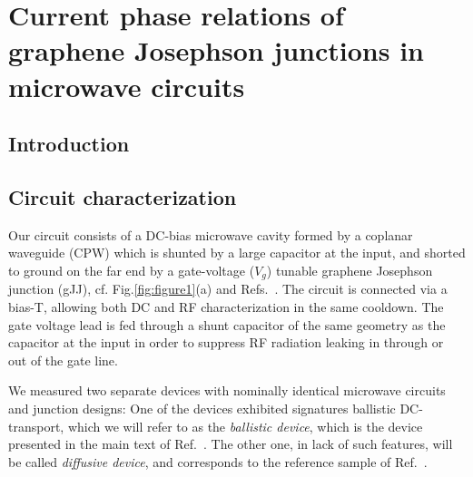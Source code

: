 \newchapstyle
\chapter{Current phase relations of graphene Josephson junctions in microwave circuits}
\label{chap:gJJ-CPR}


\begin{abstract}
	We perform extensive analysis of graphene Josephson junctions embedded in microwave circuits.
	By comparing a diffusive junction at \SI{15}{\milli\kelvin} with a ballistic one at \SI{15}{\milli\kelvin} and \SI{1}{\kelvin}, we are able to reconstruct the current-phase relation.
\end{abstract}

\newpage

\section{Introduction}

\section{Circuit characterization}

Our circuit consists of a DC-bias microwave cavity formed by a coplanar waveguide (CPW) which is shunted by a large capacitor at the input, and shorted to ground on the far end by a gate-voltage ($V_g$) tunable graphene Josephson junction (gJJ), cf. Fig.\ref{fig:figure1}(a) and Refs.~\cite{schmidtBallisticGrapheneSuperconducting2018,schmidtCurrentDetectionUsing2020,bosmanBroadbandArchitectureGalvanically2015c}.
%
The circuit is connected via a bias-T, allowing both DC and RF characterization in the same cooldown.
%
The gate voltage lead is fed through a shunt capacitor of the same geometry as the capacitor at the input in order to suppress RF radiation leaking  in through or out of the gate line.

We measured two separate devices with nominally identical microwave circuits and junction designs:
%
One of the devices exhibited signatures ballistic DC-transport, which we will refer to as the \textit{ballistic device}, which is the device presented in the main text of Ref.~\cite{schmidtBallisticGrapheneSuperconducting2018}.
%
The other one, in lack of such features, will be called \textit{diffusive device}, and corresponds to the reference sample of Ref.~\cite{schmidtBallisticGrapheneSuperconducting2018}.

